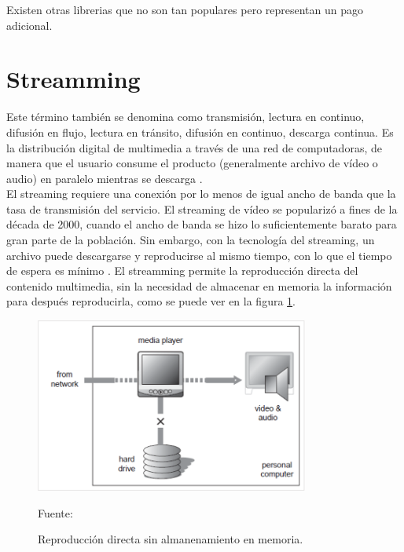 Existen otras librerias que no son tan populares pero representan un pago adicional.

\section{Streamming}
Este término también se denomina como transmisión, lectura en continuo, difusión en flujo, lectura en tránsito, difusión en continuo, descarga continua. Es la distribución digital de multimedia a través de una red de computadoras, de manera que el usuario consume el producto (generalmente archivo de vídeo o audio) en paralelo mientras se descarga \cite{streamming:austerberry}.\\

El streaming requiere una conexión por lo menos de igual ancho de banda que la tasa de transmisión del servicio. El streaming de vídeo se popularizó a fines de la década de 2000, cuando el ancho de banda se hizo lo suficientemente barato para gran parte de la población. Sin embargo, con la tecnología del streaming, un archivo puede descargarse y reproducirse al mismo tiempo, con lo que el tiempo de espera es mínimo \cite{streamming:austerberry}. El streamming permite la reproducción directa del contenido multimedia, sin la necesidad de almacenar en memoria la información para después reproducirla, como se puede ver en la figura \ref{fig:stream}.\\

\begin{figure}[H]
    \begin{center}
        \includegraphics[width=9cm]{img/capitulo_2/stream.png}
    \end{center}
    \begin{center}
        \caption{Reproducción directa sin almanenamiento en memoria.}
        Fuente: \cite{streamming:austerberry}
        \label{fig:stream}
    \end{center}
\end{figure}


